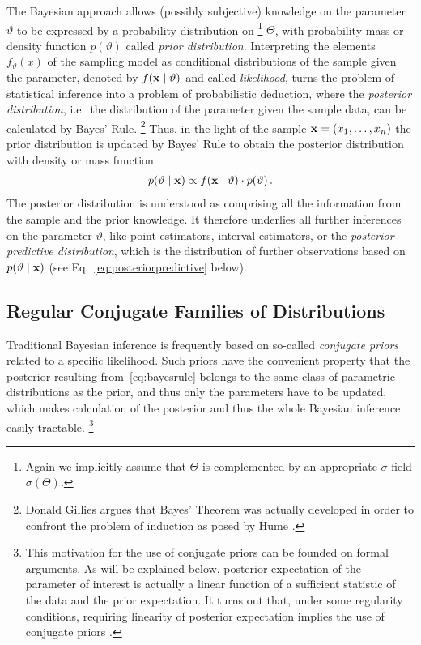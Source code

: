 The Bayesian approach allows (possibly subjective) knowledge on the parameter $\vartheta$ to be expressed by a probability distribution on%
\footnote{Again we implicitly assume that $\Theta$ is complemented by an appropriate $\sigma$-field $\sigma(\Theta)$.}
$\Theta$, with probability mass or density function $p(\vartheta)$ called \emph{prior distribution}.
Interpreting the elements $f_\vartheta(x)$ of the sampling model as conditional distributions of the sample given the parameter,
denoted by $f(\mathbf{x}\mid\vartheta)$ and called \emph{likelihood},
turns the problem of statistical inference into a problem of probabilistic deduction,
where the \emph{posterior distribution}, i.e.\ the distribution of the parameter given the sample data,
can be calculated by Bayes' Rule.%
\footnote{Donald Gillies \cite{1987:gillies, 2000:gillies} argues that Bayes' Theorem was actually developed
in order to confront the problem of induction as posed by Hume \cite{1739:hume}.}
Thus, in the light of the sample $\mathbf{x}= (x_1, \ldots, x_n)$ the prior distribution is updated by Bayes' Rule
to obtain the posterior distribution with density or mass function
\begin{align}
\label{eq:bayesrule}
p(\vartheta\mid\mathbf{x}) \propto f(\mathbf{x}\mid\vartheta) \cdot p(\vartheta)\,.
\end{align}
The posterior distribution is understood as comprising all the information from the sample and the prior knowledge.
It therefore underlies all further inferences on the parameter $\vartheta$,
like point estimators, interval estimators,
or the \emph{posterior predictive distribution},
which is the distribution of further observations based on $p(\vartheta\mid\mathbf{x})$
(see Eq.~\eqref{eq:posteriorpredictive} below).


\subsection{Regular Conjugate Families of Distributions}

Traditional Bayesian inference is frequently based on so-called \emph{conjugate priors} related to a specific likelihood.
Such priors have the convenient property that the posterior resulting from~\eqref{eq:bayesrule}
belongs to the same class of parametric distributions as the prior, and thus only the parameters have to be updated,
which makes calculation of the posterior and thus the whole Bayesian inference easily tractable.%
\footnote{This motivation for the use of conjugate priors can be founded on formal arguments.
As will be explained below, posterior expectation of the parameter of interest
is actually a linear function of a sufficient statistic of the data and the prior expectation.
It turns out that, under some regularity conditions, requiring linearity of posterior expectation
implies the use of conjugate priors \cite[p.~276]{2000:bernardosmith}.}

